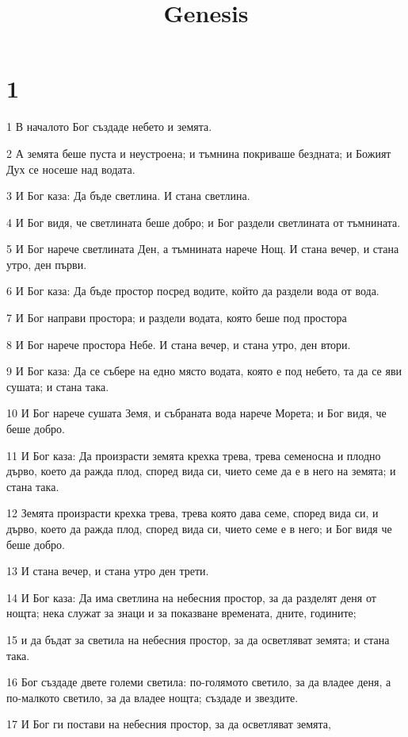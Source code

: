 

\title{Genesis}


\chapter{1}

\par 1 В началото Бог създаде небето и земята.
\par 2 А земята беше пуста и неустроена; и тъмнина покриваше бездната; и Божият Дух се носеше над водата.
\par 3 И Бог каза: Да бъде светлина. И стана светлина.
\par 4 И Бог видя, че светлината беше добро; и Бог раздели светлината от тъмнината.
\par 5 И Бог нарече светлината Ден, а тъмнината нарече Нощ. И стана вечер, и стана утро, ден първи.
\par 6 И Бог каза: Да бъде простор посред водите, който да раздели вода от вода.
\par 7 И Бог направи простора; и раздели водата, която беше под простора
\par 8 И Бог нарече простора Небе. И стана вечер, и стана утро, ден втори.
\par 9 И Бог каза: Да се събере на едно място водата, която е под небето, та да се яви сушата; и стана така.
\par 10 И Бог нарече сушата Земя, и събраната вода нарече Морета; и Бог видя, че беше добро.
\par 11 И Бог каза: Да произрасти земята крехка трева, трева семеносна и плодно дърво, което да ражда плод, според вида си, чието семе да е в него на земята; и стана така.
\par 12 Земята произрасти крехка трева, трева която дава семе, според вида си, и дърво, което да ражда плод, според вида си, чието семе е в него; и Бог видя че беше добро.
\par 13 И стана вечер, и стана утро ден трети.
\par 14 И Бог каза: Да има светлина на небесния простор, за да разделят деня от нощта; нека служат за знаци и за показване времената, дните, годините;
\par 15 и да бъдат за светила на небесния простор, за да осветляват земята; и стана така.
\par 16 Бог създаде двете големи светила: по-голямото светило, за да владее деня, а по-малкото светило, за да владее нощта; създаде и звездите.
\par 17 И Бог ги постави на небесния простор, за да осветляват земята,
